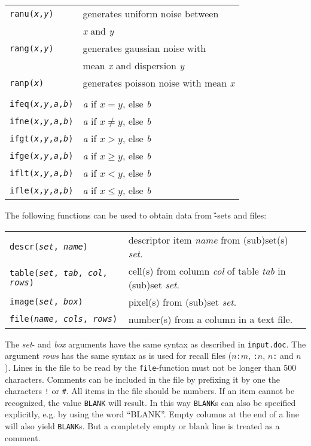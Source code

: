 {\begin{tabular}{ll}
{\tt ranu({\it x},{\it y})}&generates uniform noise between\\
&{\it x} and {\it y}\\
{\tt rang({\it x},{\it y})}&generates gaussian noise with\\
&mean {\it x} and dispersion {\it y}\\
{\tt ranp({\it x})}&generates poisson noise with mean {\it x}\\
\\
{\tt ifeq({\it x},{\it y},{\it a},{\it b})}&
{\it a} if $x=y$, else {\it b} \\
{\tt ifne({\it x},{\it y},{\it a},{\it b})}&
{\it a} if $x \neq y$, else {\it b} \\
{\tt ifgt({\it x},{\it y},{\it a},{\it b})}&
{\it a} if $x > y$, else {\it b} \\
{\tt ifge({\it x},{\it y},{\it a},{\it b})}&
{\it a} if $x \geq y$, else {\it b} \\
{\tt iflt({\it x},{\it y},{\it a},{\it b})}&
{\it a} if $x<y$, else {\it b} \\
{\tt ifle({\it x},{\it y},{\it a},{\it b})}&
{\it a} if $x\leq y$, else {\it b} \\
\end{tabular}
}

The following functions can be used to obtain data from \G -sets and files:

{\small
\begin{tabular}{ll}
{\tt descr({\it set}, {\it name})}&descriptor item {\it name}\/ from
(sub)set(s) {\it set}.\\
{\tt table({\it set}, {\it tab}, {\it col}, {\it rows})}&
cell(s) from column {\it col}\/ of table {\it tab} in (sub)set {\it set}.\\
{\tt image({\it set}, {\it box})}&  pixel(s) from (sub)set {\it set}.\\
{\tt file({\it name}, {\it cols}, {\it rows})}&number(s) from a column in 
a text file.\\
\end{tabular}
}

The {\it set}- and {\it box}\/ arguments have the same syntax as described
in {\tt input.doc}.
The argument {\it rows} has the same syntax as is used for recall files
($n${\tt:}$m$, {\tt:}$n$, $n${\tt:} and  $n$).
Lines in the file to be read by the {\tt file}-function must not be longer than
500 characters.
Comments can be included in the file by prefixing it by one the characters
{\tt !} or {\tt \#}.
All items in the file should be numbers.
If an item cannot be recognized, the value {\tt BLANK} will result.
In this way {\tt BLANK}s can also be specified explicitly, e.g. by using
the word ``BLANK''. Empty columns at the end of a line will also yield
{\tt BLANK}s. But a completely empty or blank line is treated as a comment.

